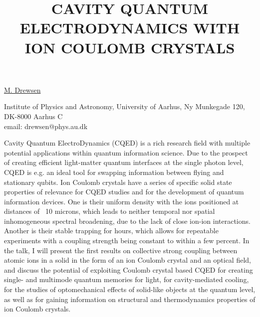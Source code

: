 \title{CAVITY QUANTUM ELECTRODYNAMICS WITH ION COULOMB CRYSTALS}

\underline{M. Drewsen}


Institute of Physics and Astronomy, University of Aarhus, Ny Munkegade 120, DK-8000 Aarhus C\\
email: drewsen@phys.au.dk

Cavity Quantum ElectroDynamics (CQED) is a rich research field with multiple potential applications within quantum information science. Due to the prospect of creating efficient light-matter quantum interfaces at the single photon level, CQED is e.g. an ideal tool for swapping information between flying and stationary qubits. Ion Coulomb crystals have a series of specific solid state properties of relevance for CQED studies and for the development of quantum information devices. One is their uniform density with the ions positioned at distances of ~10 microns, which leads to neither temporal nor spatial inhomogeneous spectral broadening, due to the lack of close ion-ion interactions. Another is their stable trapping for hours, which allows for repeatable experiments with a coupling strength being constant to within a few percent.
In the talk, I will present the first results on collective strong coupling between atomic ions in a solid in the form of an ion Coulomb crystal and an optical field, and discuss the potential of exploiting Coulomb crystal based CQED for creating single- and multimode quantum memories for light, for cavity-mediated cooling, for the studies of optomechanical effects of solid-like objects at the quantum level, as well as for gaining information on structural and thermodynamics properties of ion Coulomb crystals.

\vspace{\baselineskip}